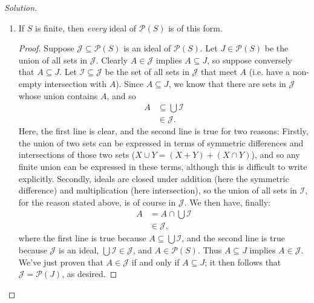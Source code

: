 \documentclass[12pt]{article}
\newenvironment{solution}
  {\renewcommand\qedsymbol{$\blacksquare$}\begin{proof}[Solution]}
{\end{proof}}
\newenvironment{sproof}{
  \renewcommand\qedsymbol{$\square$}
  \begin{proof}
  }{
  \end{proof}
}
\theoremstyle{remark}
\begin{document}
\begin{solution}
\begin{enumerate}
    \item If $S$ is finite, then \textit{every} ideal of $\mathscr{P}(S)$ is of this form.
      \begin{sproof}
        \indent Suppose $\mathcal{J}\subseteq\mathscr{P}(S)$ 
        is an ideal of $\mathscr{P}(S)$.
        Let $J\in\mathscr{P}(S)$ be the union of all sets in $\mathcal{J}$.
        Clearly $A\in \mathcal{J}$ implies $A\subseteq J$, so suppose conversely that $A\subseteq J$.
        Let $\mathcal{I}\subseteq\mathcal{J}$ be the set of all sets in $\mathcal{J}$ that meet $A$
        (i.e. have a non-empty intersection with $A$).
        Since $A\subseteq J$, we know that there are sets in $\mathcal{J}$ whose union contains $A$, and so
        \begin{align*}
          A &\subseteq \bigcup\mathcal{I} \\
          &\in \mathcal{J}.
        \end{align*}
        \indent Here, the first line is clear, and the second line is true for two reasons: 
        Firstly, the union of two sets can be expressed in terms of symmetric 
        differences and intersections of those two sets ($X\cup Y=(X+Y)+(X\cap Y)$), 
        and so any finite union can be expressed in these terms, although this is
        difficult to write explicitly.
        Secondly, ideals are closed under addition (here the symmetric difference) and multiplication 
        (here intersection), so the union of all sets in $\mathcal{I}$, for the reason stated above,
        is of course in $\mathcal{J}$.
        We then have, finally:
        \begin{align*}
          A &= A\cap\bigcup\mathcal{I}\\
          &\in\mathcal{J},
        \end{align*}
        where the first line is true because $A\subseteq\bigcup\mathcal{I}$, and the second line
        is true because $\mathcal{J}$ is an ideal, $\bigcup\mathcal{I}\in\mathcal{J}$, and 
        $A\in\mathscr{P}(S)$.
        Thus $A\subseteq J$ implies $A\in\mathcal{J}$.\\
        \indent We've just proven that $A\in\mathcal{J}$ if and only if $A\subseteq J$; it then follows
        that $\mathcal{J} = \mathscr{P}(J)$, as desired.
      \end{sproof}


\end{enumerate}
\end{solution}
\end{document}
